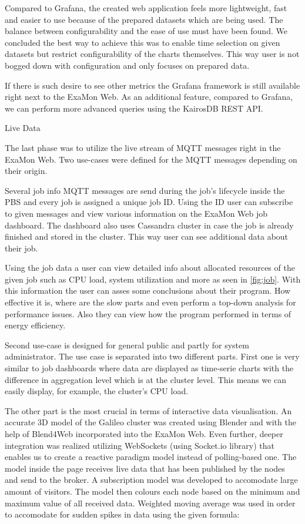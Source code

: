 \documentclass[a4paper, twoside]{article}
\newcommand{\highlight}[1]{\textcolor{prace-orange}{#1}}
\newcommand{\itempar}[1]{\noindent\highlight{\textsf #1}\par\noindent}
\begin{document}
\begin{multicols}{3}
Compared to Grafana, the created web application feels more lightweight, fast and easier to use because of the prepared datasets which are being used. The balance between configurability and the ease of use must have been found. We concluded the best way to achieve this was to enable time selection on given datasets but restrict configurability of the charts themselves. This way user is not bogged down with configuration and only focuses on prepared data.

If there is such desire to see other metrics the Grafana framework is still available right next to the ExaMon Web. As an additional feature, compared to Grafana, we can perform more advanced queries using the KairosDB REST API.

\itempar{Live Data}
The last phase was to utilize the live stream of MQTT messages right in the ExaMon Web. Two use-cases were defined for the MQTT messages depending on their origin.

Several job info MQTT messages are send during the job's lifecycle inside the PBS and every job is assigned a unique job ID. Using the ID user can subscribe to given messages and view various information on the ExaMon Web job dashboard. The dashboard also uses Cassandra cluster in case the job is already finished and stored in the cluster. This way user can see additional data about their job.

Using the job data a user can view detailed info about allocated resources of the given job such as CPU load, system utilization and more as seen in \ref{fig:job}. With this information the user can asses some conclusions about their program. How effective it is, where are the slow parts and even perform a top-down analysis for performance issues. Also they can view how the program performed in terms of energy efficiency.

Second use-case is designed for general public and partly for system administrator. The use case is separated into two different parts. First one is very similar to job dashboards where data are displayed as time-serie charts with the difference in aggregation level which is at the cluster level. This means we can easily display, for example, the cluster's CPU load.

The other part is the most crucial in terms of interactive data visualisation. An accurate 3D model of the Galileo cluster was created using Blender and with the help of Blend4Web incorporated into the ExaMon Web. Even further, deeper integration was realized utilizing WebSockets (using Socket.io library) that enables us to create a reactive paradigm model instead of polling-based one. The model inside the page receives live data that has been published by the nodes and send to the broker. A subscription model was developed to accomodate large amount of visitors. The model then colours each node based on the minimum and maximum value of all received data. Weighted moving average was used in order to accomodate for sudden spikes in data using the given formula:


\end{multicols}
\end{document}
